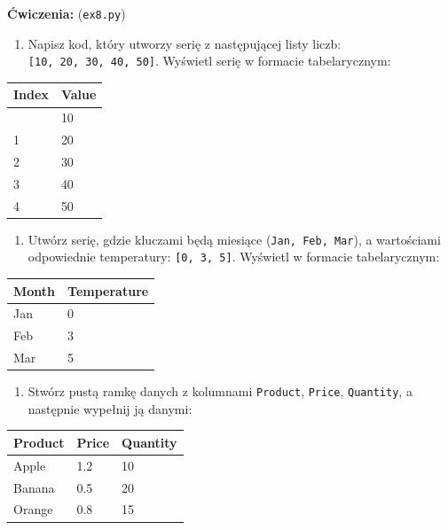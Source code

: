 \documentclass[
  polish,
  letterpaper,
  DIV=11,
  numbers=noendperiod]{scrreprt}
\newcounter{none} %
\providecommand{\tightlist}{%
  \setlength{\itemsep}{0pt}\setlength{\parskip}{0pt}}
\begin{document}
\textbf{Ćwiczenia:} (\texttt{ex8.py})

\begin{enumerate}
\def\labelenumi{\arabic{enumi}.}
\tightlist
\item
  Napisz kod, który utworzy serię z następującej listy liczb:
  \texttt{{[}10,\ 20,\ 30,\ 40,\ 50{]}}. Wyświetl serię w formacie
  tabelarycznym:
\end{enumerate}

{\def\LTcaptype{none} %
\begin{longtable}[]{@{}ll@{}}
\toprule\noalign{}
Index & Value \\
\midrule\noalign{}
\endhead
\bottomrule\noalign{}
\endlastfoot
0 & 10 \\
1 & 20 \\
2 & 30 \\
3 & 40 \\
4 & 50 \\
\end{longtable}
}

\begin{enumerate}
\def\labelenumi{\arabic{enumi}.}
\setcounter{enumi}{1}
\tightlist
\item
  Utwórz serię, gdzie kluczami będą miesiące
  (\texttt{\textquotesingle{}Jan\textquotesingle{},\ \textquotesingle{}Feb\textquotesingle{},\ \textquotesingle{}Mar\textquotesingle{}}),
  a wartościami odpowiednie temperatury: \texttt{{[}0,\ 3,\ 5{]}}.
  Wyświetl w formacie tabelarycznym:
\end{enumerate}

{\def\LTcaptype{none} %
\begin{longtable}[]{@{}ll@{}}
\toprule\noalign{}
Month & Temperature \\
\midrule\noalign{}
\endhead
\bottomrule\noalign{}
\endlastfoot
Jan & 0 \\
Feb & 3 \\
Mar & 5 \\
\end{longtable}
}

\begin{enumerate}
\def\labelenumi{\arabic{enumi}.}
\setcounter{enumi}{2}
\tightlist
\item
  Stwórz pustą ramkę danych z kolumnami \texttt{Product},
  \texttt{Price}, \texttt{Quantity}, a następnie wypełnij ją danymi:
\end{enumerate}

{\def\LTcaptype{none} %
\begin{longtable}[]{@{}lll@{}}
\toprule\noalign{}
Product & Price & Quantity \\
\midrule\noalign{}
\endhead
\bottomrule\noalign{}
\endlastfoot
Apple & 1.2 & 10 \\
Banana & 0.5 & 20 \\
Orange & 0.8 & 15 \\
\end{longtable}
}
\end{document}
